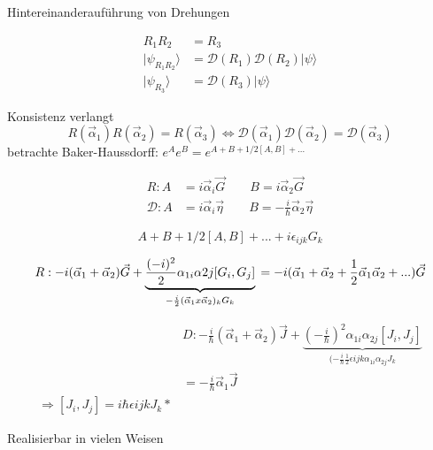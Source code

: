 Hintereinanderauführung von Drehungen

\begin{align}
R_1R_2&=R_3 \\
|\psi_{R_1R_2}\rangle&=\mathcal D(R_1)\mathcal D(R_2)|\psi\rangle  \\
|\psi_{R_3}\rangle &=\mathcal D(R_3)|\psi\rangle 
\end{align}


Konsistenz verlangt
\[
R(\vec \alpha_1)R(\vec \alpha_2)=R(\vec \alpha_3) \Leftrightarrow  \mathcal D(\vec \alpha_1) \mathcal D(\vec \alpha_2)= \mathcal D(\vec \alpha_3)
\]
betrachte Baker-Haussdorff: \(e^Ae^B=e^{A+B+1/2[A,B]+...}\)

\begin{align}
R: A&=i\vec \alpha_i\vec G \qquad B=i\vec \alpha_2\vec G \\
\mathcal D: A&=i\vec \alpha_i\vec \eta \qquad B=-\frac i \hbar \vec \alpha_2\vec \eta
\end{align}


\[
A+B+1/2[A,B]+...+i\epsilon_{ijk}G_k
\]


\[
R:-i(\vec \alpha_1+\vec \alpha_2)\vec G + \underbrace {\frac {(-i)^2} 2
  \alpha_{1i}\alpha{2j}[G_i,G_j]}_{-\frac i 2 (\vec \alpha_1 x\vec
  \alpha_2)_kG_k}\\
=-i(\vec \alpha_1+\vec \alpha_2+\frac 1 2 \vec \alpha_1\vec \alpha_2+...)\vec G
\]

\begin{align}
&D:-\frac i \hbar (\vec \alpha_1+\vec \alpha_2)\vec J +\underbrace{ (-\frac i \hbar)^2\alpha_{1i}\alpha_{2j}[J_i,J_j]}_{(-\frac i \hbar \frac 1 2 \epsilon{ijk}\alpha_{1i}\alpha_{2j}J_k}\\
&=-\frac i \hbar \vec \alpha_1\vec J \\
\Rightarrow \boxed{[J_i,J_j] = i\hbar \epsilon {ijk} J_k}* 
\end{align}


Realisierbar in vielen Weisen


